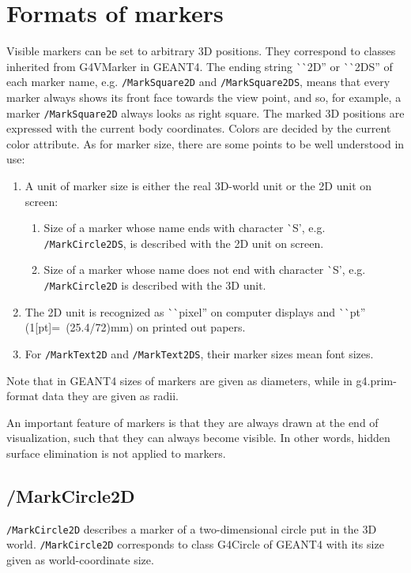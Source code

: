\section{Formats of markers}  

Visible markers can be set to arbitrary 3D positions.  
They correspond to classes inherited from G4VMarker in GEANT4. 
The ending string ^^ ^^ 2D'' or ^^ ^^ 2DS''  of each marker name,
e.g. \mbox{\verb+/MarkSquare2D+} and \mbox{\verb+/MarkSquare2DS+},
means that every marker always shows its front face towards the view point,
and so, for example, a marker \verb+/MarkSquare2D+  always looks
as right square.
The marked 3D positions are expressed with the current body coordinates.  
Colors are decided by the current color attribute.
As for marker size, there are some points to be well understood in use:
\begin{enumerate}
\item A unit of marker size is either the real 3D-world unit
      or the 2D unit on screen:
	\begin{enumerate}      
	\item Size of a marker whose name ends with character ^^ S', e.g.\\
	      \verb+/MarkCircle2DS+, 
	      is described with the 2D unit on screen. 
	\item  Size of a marker whose name does not end with character ^^ S', 
	       e.g. \verb+/MarkCircle2D+ is described with the 3D unit.
	\end{enumerate}
\item The 2D unit is recognized as ^^ ^^ pixel'' on computer displays
      and ^^ ^^ pt'' \mbox{(1[pt]= (25.4/72)mm)} on printed out papers.
\item For \verb+/MarkText2D+ and \verb+/MarkText2DS+, their marker  sizes
      mean font sizes. 
\end{enumerate}
Note that in GEANT4 sizes of markers are given as diameters, 
while in g4.prim-format data they are given as radii.  

An important feature of markers is that they are always
drawn at the end of visualization, such that they can always
become visible. In other words,
hidden surface elimination is not applied to markers.



\subsection{/MarkCircle2D}
\verb+/MarkCircle2D+ describes a marker of a two-dimensional circle
put in the 3D world.
\verb+/MarkCircle2D+ corresponds to class G4Circle of GEANT4 with
its size given as world-coordinate size.
\vspace{.20in}

